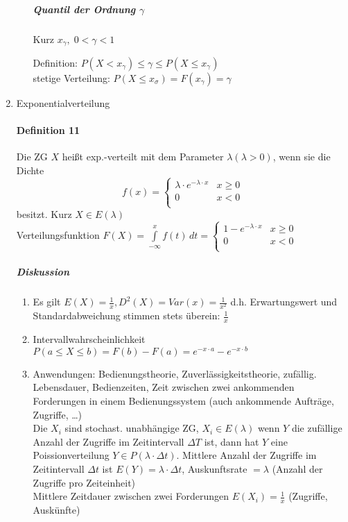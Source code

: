 \documentclass[a4paper]{scrartcl}
\begin{document}
\begin{enumerate}
\begin{enumerate}
        \subparagraph{Quantil der Ordnung $\gamma$} Kurz $x_\gamma , \; 0 < \gamma < 1$
        
        Definition: $P(X < x_\gamma ) \leq \gamma \leq P(X \leq x_\gamma)$\\
        stetige Verteilung: $P(X \leq x_\sigma ) = F(x_\gamma) = \gamma$
    \end{enumerate}

\item Exponentialverteilung
\paragraph{Definition 11} Die ZG $X$ heißt exp.-verteilt mit dem Parameter $\lambda (\lambda > 0)$, wenn sie die Dichte 
\[ f(x) = \left \{ \begin{array}{lr} \lambda \cdot e^{-\lambda \cdot x} & x \geq 0 \\ 0 & x <0 \\ \end{array} \right. \] besitzt. Kurz $X \in E(\lambda)$\\
Verteilungsfunktion $F(X) = \int\limits_{-\infty}^{x} f(t) \, dt = \left \{ \begin{array}{lr} 1 - e^{-\lambda \cdot x} & x \geq 0 \\ 0 & x <0 \\ \end{array} \right. $


\subparagraph{Diskussion} 
    \begin{enumerate}
    \item Es gilt $E(X) = \frac{1}{x}, D^2 (X) = Var(x) = \frac{1}{x^2}$ d.h. Erwartungswert und Standardabweichung stimmen stets überein: $\frac{1}{x}$
    \item Intervallwahrscheinlichkeit $P(a\leq X \leq b) = F(b) - F(a) = e^{-x \cdot a} - e^{-x \cdot b}$
    \item Anwendungen: Bedienungstheorie, Zuverlässigkeitstheorie, zufällig. Lebensdauer, Bedienzeiten, Zeit zwischen zwei ankommenden Forderungen in einem Bedienungssystem (auch ankommende Aufträge, Zugriffe, \dots)\\
    Die $X_i$ sind stochast. unabhängige ZG, $X_i \in E(\lambda)$ wenn $Y$ die zufällige Anzahl der Zugriffe im Zeitintervall $\Delta T$ ist, dann hat $Y$ eine Poissionverteilung $Y \in P(\lambda \cdot \Delta t)$. Mittlere Anzahl der Zugriffe im Zeitintervall $\Delta t$ ist $E(Y) = \lambda \cdot \Delta t$, Auskunftsrate $= \lambda$ (Anzahl der Zugriffe pro Zeiteinheit)\\
    Mittlere Zeitdauer zwischen zwei Forderungen $E(X_i) = \frac{1}{x}$ (Zugriffe, Auskünfte)
    

\end{enumerate}
\end{enumerate}
\end{document}

